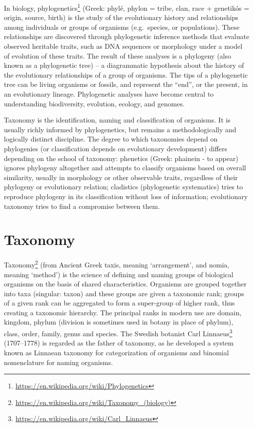 \documentclass[]{book}
\let\rmarkdownfootnote\footnote%
\def\footnote{\protect\rmarkdownfootnote}
\renewcommand{\href}[2]{#2\footnote{\url{#1}}}
\theoremstyle{definition}
\theoremstyle{definition}
\theoremstyle{definition}
\theoremstyle{remark}
\begin{document}
In biology,
\href{https://en.wikipedia.org/wiki/Phylogenetics}{phylogenetics}
(Greek: phylé, phylon = tribe, clan, race + genetikós = origin, source,
birth) is the study of the evolutionary history and relationships among
individuals or groups of organisms (e.g.~species, or populations). These
relationships are discovered through phylogenetic inference methods that
evaluate observed heritable traits, such as DNA sequences or morphology
under a model of evolution of these traits. The result of these analyses
is a phylogeny (also known as a phylogenetic tree) -- a diagrammatic
hypothesis about the history of the evolutionary relationships of a
group of organisms. The tips of a phylogenetic tree can be living
organisms or fossils, and represent the ``end'', or the present, in an
evolutionary lineage. Phylogenetic analyses have become central to
understanding biodiversity, evolution, ecology, and genomes.

Taxonomy is the identification, naming and classification of organisms.
It is usually richly informed by phylogenetics, but remains a
methodologically and logically distinct discipline. The degree to which
taxonomies depend on phylogenies (or classification depends on
evolutionary development) differs depending on the school of taxonomy:
phenetics (Greek: phainein - to appear) ignores phylogeny altogether and
attempts to classify organisms based on overall similarity, usually in
morphology or other observable traits, regardless of their phylogeny or
evolutionary relation; cladistics (phylogenetic systematics) tries to
reproduce phylogeny in its classification without loss of information;
evolutionary taxonomy tries to find a compromise between them.  

\section{Taxonomy}\label{taxonomy}

\href{https://en.wikipedia.org/wiki/Taxonomy_(biology)}{Taxonomy} (from
Ancient Greek taxis, meaning `arrangement', and nomia, meaning `method')
is the science of defining and naming groups of biological organisms on
the basis of shared characteristics. Organisms are grouped together into
taxa (singular: taxon) and these groups are given a taxonomic rank;
groups of a given rank can be aggregated to form a super-group of higher
rank, thus creating a taxonomic hierarchy. The principal ranks in modern
use are domain, kingdom, phylum (division is sometimes used in botany in
place of phylum), class, order, family, genus and species. The Swedish
botanist \href{https://en.wikipedia.org/wiki/Carl_Linnaeus}{Carl Linnaeus} (1707--1778) is regarded as the father of taxonomy, as he
developed a system known as Linnaean taxonomy for categorization of
organisms and binomial nomenclature for naming organisms.
\end{document}
